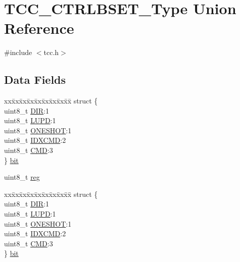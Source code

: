 \hypertarget{union_t_c_c___c_t_r_l_b_s_e_t___type}{}\section{T\+C\+C\+\_\+\+C\+T\+R\+L\+B\+S\+E\+T\+\_\+\+Type Union Reference}
\label{union_t_c_c___c_t_r_l_b_s_e_t___type}


{\ttfamily \#include $<$tcc.\+h$>$}

\subsection*{Data Fields}
\begin{DoxyCompactItemize}
\item 
\begin{tabbing}
xx\=xx\=xx\=xx\=xx\=xx\=xx\=xx\=xx\=\kill
struct \{\\
\>uint8\_t \mbox{\hyperlink{union_t_c_c___c_t_r_l_b_s_e_t___type_a58808c7e66b07b82b662e956b63f7e70}{DIR}}:1\\
\>uint8\_t \mbox{\hyperlink{union_t_c_c___c_t_r_l_b_s_e_t___type_a8ac44d571fac48acf217bb9425d04bdb}{LUPD}}:1\\
\>uint8\_t \mbox{\hyperlink{union_t_c_c___c_t_r_l_b_s_e_t___type_a7b9c94dc8f69244e81941bd1c96ca561}{ONESHOT}}:1\\
\>uint8\_t \mbox{\hyperlink{union_t_c_c___c_t_r_l_b_s_e_t___type_abcff3047a0fc0306fbcbb7fac8c26b97}{IDXCMD}}:2\\
\>uint8\_t \mbox{\hyperlink{union_t_c_c___c_t_r_l_b_s_e_t___type_a1c855495e78c2efdf239795ed16d8b3e}{CMD}}:3\\
\} \mbox{\hyperlink{union_t_c_c___c_t_r_l_b_s_e_t___type_a98c41e7fac1041a92c29ec956ad04368}{bit}}\\

\end{tabbing}\item 
uint8\+\_\+t \mbox{\hyperlink{union_t_c_c___c_t_r_l_b_s_e_t___type_a9428adc9af4653a2050e2536b55dec8d}{reg}}
\item 
\begin{tabbing}
xx\=xx\=xx\=xx\=xx\=xx\=xx\=xx\=xx\=\kill
struct \{\\
\>uint8\_t \mbox{\hyperlink{union_t_c_c___c_t_r_l_b_s_e_t___type_a58808c7e66b07b82b662e956b63f7e70}{DIR}}:1\\
\>uint8\_t \mbox{\hyperlink{union_t_c_c___c_t_r_l_b_s_e_t___type_a8ac44d571fac48acf217bb9425d04bdb}{LUPD}}:1\\
\>uint8\_t \mbox{\hyperlink{union_t_c_c___c_t_r_l_b_s_e_t___type_a7b9c94dc8f69244e81941bd1c96ca561}{ONESHOT}}:1\\
\>uint8\_t \mbox{\hyperlink{union_t_c_c___c_t_r_l_b_s_e_t___type_abcff3047a0fc0306fbcbb7fac8c26b97}{IDXCMD}}:2\\
\>uint8\_t \mbox{\hyperlink{union_t_c_c___c_t_r_l_b_s_e_t___type_a1c855495e78c2efdf239795ed16d8b3e}{CMD}}:3\\
\} \mbox{\hyperlink{union_t_c_c___c_t_r_l_b_s_e_t___type_ab16e1a3d4a9f11337158016c871b137a}{bit}}\\

\end{tabbing}\end{DoxyCompactItemize}



